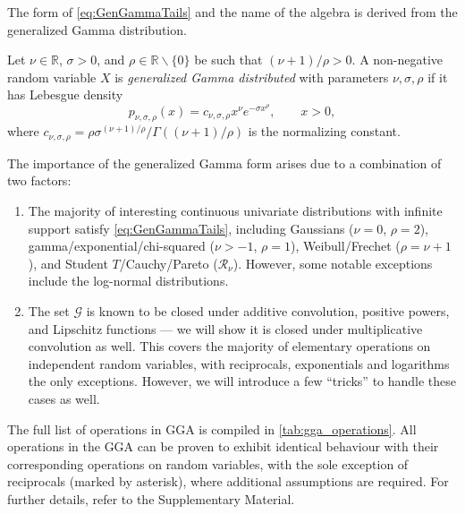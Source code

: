 \documentclass[thesis.tex]{subfiles}
\begin{document}
The form of \cref{eq:GenGammaTails} and the name of the algebra is derived from the generalized Gamma distribution. 
\begin{definition}
Let $\nu \in \mathbb{R}$, $\sigma > 0$, and $\rho \in \mathbb{R} \backslash \{0\}$ be such that $(\nu+1)/ \rho > 0$.
A non-negative random variable $X$ is \emph{generalized Gamma distributed} with parameters $\nu,\sigma,\rho$ if it has Lebesgue density
\begin{equation}
\label{eq:GenGammaDensity}
p_{\nu,\sigma,\rho}(x) = c_{\nu,\sigma,\rho} x^\nu e^{-\sigma x^\rho},\qquad x > 0,
\end{equation}
where $c_{\nu,\sigma,\rho} = \rho \sigma^{(\nu+1)/\rho} / \Gamma((\nu+1)/\rho)$ is the normalizing constant. %
\end{definition}
The importance of the generalized Gamma form arises due to a combination of two factors:
\begin{enumerate}[label={(\roman*)},leftmargin=*]
    \item The majority of interesting continuous univariate distributions with infinite support satisfy \cref{eq:GenGammaTails}, including
    Gaussians ($\nu=0$, $\rho=2$),
    gamma/exponential/chi-squared ($\nu > -1$, $\rho=1$), Weibull/Frechet ($\rho = \nu + 1$), and
    Student $T$/Cauchy/Pareto ($\mathcal{R}_\nu$).
    However, some notable exceptions include the log-normal distributions. 
    \item The set $\mathcal{G}$ is known to be closed under additive convolution, positive powers, and Lipschitz functions --- we will show it is closed under multiplicative convolution as well. This covers the majority of elementary operations on independent random variables, with reciprocals, exponentials and logarithms the only exceptions. However, we will introduce a few ``tricks'' to handle these cases as well. 
\end{enumerate}
The full list of operations in GGA is compiled in \cref{tab:gga_operations}. All operations in the GGA can be proven to exhibit identical behaviour with their corresponding operations on random variables, with the sole exception of reciprocals (marked by asterisk), where additional assumptions are required. For further details, refer to the Supplementary Material.

\end{document}
